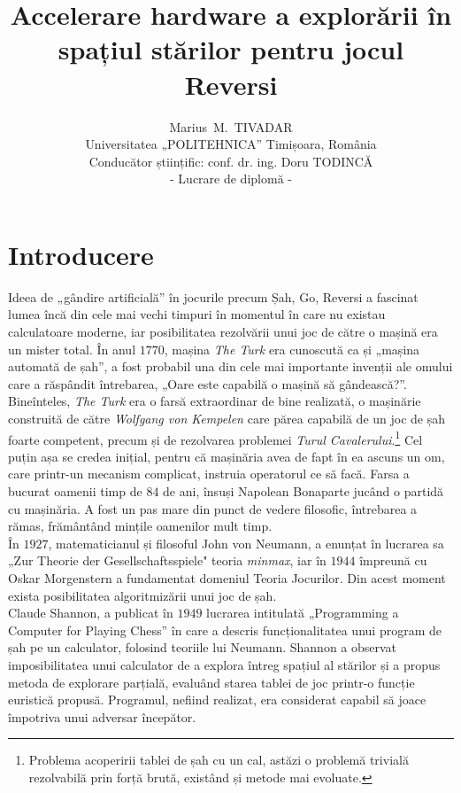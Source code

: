 \documentclass[12pt,twoside,a4paper,fleqn]{book}
\title{\huge{Accelerare hardware a explorării în spațiul stărilor pentru jocul Reversi}}
\author{
Marius~M.~TIVADAR\\
Universitatea „POLITEHNICA” Timișoara, România\\
Conducător științific: conf. dr. ing. Doru TODINCĂ\\
- Lucrare de diplomă -
}
\newenvironment{changemargin}[2]{%
  \begin{list}{}{%
    \setlength{\topsep}{0pt}%
    \setlength{\leftmargin}{#1}%
    \setlength{\rightmargin}{#2}%
    \setlength{\listparindent}{\parindent}%
    \setlength{\itemindent}{\parindent}%
    \setlength{\parsep}{\parskip}%
  }%
  \item[]}{\end{list}}
\theoremstyle{definition}
\begin{document}
\renewcommand{\today}{21 iunie 2009}
\begin{changemargin}{-1cm}{-1cm}
\maketitle
\end{changemargin}

\tableofcontents


\chapter{Introducere}
Ideea de „gândire artificială” în jocurile precum Șah, Go, Reversi a fascinat lumea încă din cele mai vechi timpuri în momentul în care nu existau calculatoare moderne, iar posibilitatea rezolvării unui joc de către o mașină era un mister total. În anul $1770$, mașina \emph{The Turk} era cunoscută ca și „mașina automată de șah”, a fost probabil una din cele mai importante invenții ale omului care a răspândit întrebarea, „Oare este capabilă o mașină să gândească?”. Bineînteles, \emph{The Turk} era o farsă extraordinar de bine realizată, o mașinărie construită de către \emph{Wolfgang von Kempelen} care părea capabilă de un joc de șah foarte competent, precum și de rezolvarea problemei \emph{Turul Cavalerului}.\footnote{Problema acoperirii tablei de șah cu un cal, astăzi o problemă trivială rezolvabilă prin forță brută, existând și metode mai evoluate.} Cel puțin așa se credea inițial, pentru că mașinăria avea de fapt în ea ascuns un om, care printr-un mecanism complicat, instruia operatorul ce să facă. Farsa a bucurat oamenii timp de $84$ de ani, însuși Napolean Bonaparte jucând o partidă cu mașinăria. A fost un pas mare din punct de vedere filosofic, întrebarea a rămas, frământând mințile oamenilor mult timp.\\
În $1927$, matematicianul și filosoful John von Neumann, a enunțat în lucrarea sa „Zur Theorie der Gesellschaftsspiele" teoria \emph{minmax}, iar în $1944$ împreună cu Oskar Morgenstern a fundamentat domeniul Teoria Jocurilor. Din acest moment exista posibilitatea algoritmizării unui joc de șah.\cite{Shoham}\cite{allis}\\
Claude Shannon, a publicat în $1949$ lucrarea intitulată „Programming a Computer for Playing Chess” în care a descris funcționalitatea unui program de șah pe un calculator, folosind teoriile lui Neumann. Shannon a observat imposibilitatea unui calculator de a explora întreg spațiul al stărilor și a propus metoda de explorare parțială, evaluând starea tablei de joc printr-o funcție euristică propusă. Programul, nefiind realizat, era considerat capabil să joace împotriva unui adversar începător.\cite{Shannon}\\
\end{document}

